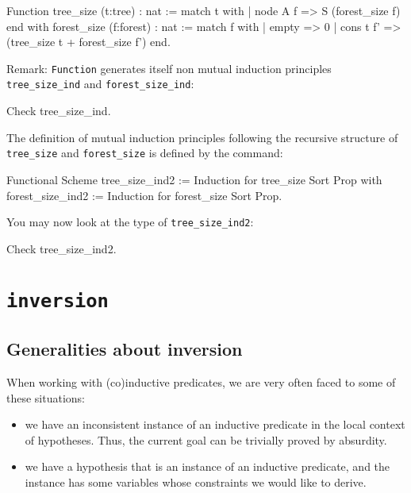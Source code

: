 \begin{coq_example*}
\begin{coq_example*}                
Function tree_size (t:tree) : nat :=
  match t with
  | node A f => S (forest_size f)
  end
 with forest_size (f:forest) : nat :=
  match f with
  | empty => 0
  | cons t f' => (tree_size t + forest_size f')
  end.
\end{coq_example*}

Remark: \texttt{Function} generates itself non mutual induction
principles {\tt tree\_size\_ind} and {\tt forest\_size\_ind}:

\begin{coq_example}
Check tree_size_ind.
\end{coq_example}

The definition of mutual induction principles following the recursive
structure of \texttt{tree\_size} and \texttt{forest\_size} is defined
by the command:

\begin{coq_example*}
Functional Scheme tree_size_ind2 := Induction for tree_size Sort Prop
with forest_size_ind2 := Induction for forest_size Sort Prop.
\end{coq_example*}

You may now look at the type of {\tt tree\_size\_ind2}:

\begin{coq_example}
Check tree_size_ind2.
\end{coq_example}




\section[{\tt inversion}]{{\tt inversion}
\label{inversion-examples}}

\subsection*{Generalities about inversion}

When working with (co)inductive predicates, we are very often faced to
some of these situations:
\begin{itemize}
\item we have an inconsistent instance of an inductive predicate in the
  local context of hypotheses. Thus, the current goal can be trivially
  proved by absurdity. 
\item we have a hypothesis that is an instance of an inductive
  predicate, and the instance has some variables whose constraints we
  would like to derive.
\end{itemize}


\end{coq_example*}
